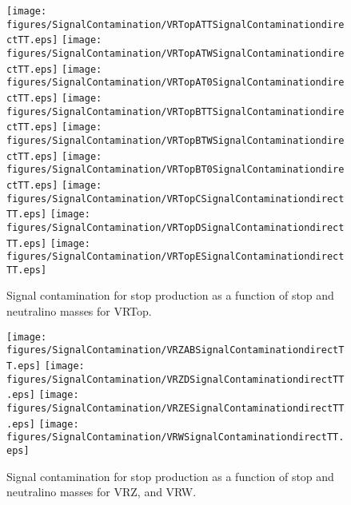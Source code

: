 \begin{figure}[htbp]
\begin{center} 
\texttt{[image: figures/SignalContamination/VRTopATTSignalContaminationdirectTT.eps]}
\texttt{[image: figures/SignalContamination/VRTopATWSignalContaminationdirectTT.eps]}
\texttt{[image: figures/SignalContamination/VRTopAT0SignalContaminationdirectTT.eps]}
\texttt{[image: figures/SignalContamination/VRTopBTTSignalContaminationdirectTT.eps]}
\texttt{[image: figures/SignalContamination/VRTopBTWSignalContaminationdirectTT.eps]}
\texttt{[image: figures/SignalContamination/VRTopBT0SignalContaminationdirectTT.eps]}
\texttt{[image: figures/SignalContamination/VRTopCSignalContaminationdirectTT.eps]}
\texttt{[image: figures/SignalContamination/VRTopDSignalContaminationdirectTT.eps]}
\texttt{[image: figures/SignalContamination/VRTopESignalContaminationdirectTT.eps]}
\caption{Signal contamination for stop production as a function of stop and neutralino masses for VRTop.}
\label{fig:Fit2ele}
\end{center}
\end{figure}

\begin{figure}[htbp]
\begin{center} 
\texttt{[image: figures/SignalContamination/VRZABSignalContaminationdirectTT.eps]}
\texttt{[image: figures/SignalContamination/VRZDSignalContaminationdirectTT.eps]}
\texttt{[image: figures/SignalContamination/VRZESignalContaminationdirectTT.eps]}
\texttt{[image: figures/SignalContamination/VRWSignalContaminationdirectTT.eps]}
\caption{Signal contamination for stop production as a function of stop and neutralino masses for VRZ, and VRW.}
\label{fig:Fit2ele}
\end{center}
\end{figure}


